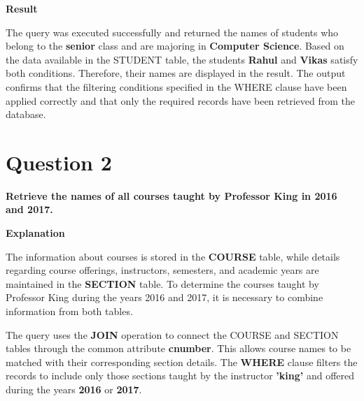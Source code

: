 \documentclass[12pt,a4paper]{report}
\begin{document}
\vspace{0.7cm}

\textbf{Result}

The query was executed successfully and returned the names of students who belong to the \textbf{senior} class and are majoring in \textbf{Computer Science}. Based on the data available in the STUDENT table, the students \textbf{Rahul} and \textbf{Vikas} satisfy both conditions. Therefore, their names are displayed in the result. The output confirms that the filtering conditions specified in the WHERE clause have been applied correctly and that only the required records have been retrieved from the database.

\newpage


\vspace{-1cm}

\section*{Question 2}

\textbf{Retrieve the names of all courses taught by Professor King in 2016 and 2017.}

\vspace{0.4cm}

\textbf{Explanation}

The information about courses is stored in the \textbf{COURSE} table, while details regarding course offerings, instructors, semesters, and academic years are maintained in the \textbf{SECTION} table. To determine the courses taught by Professor King during the years 2016 and 2017, it is necessary to combine information from both tables.

The query uses the \textbf{JOIN} operation to connect the COURSE and SECTION tables through the common attribute \textbf{cnumber}. This allows course names to be matched with their corresponding section details. The \textbf{WHERE} clause filters the records to include only those sections taught by the instructor \textbf{'king'} and offered during the years \textbf{2016} or \textbf{2017}.
\end{document}
